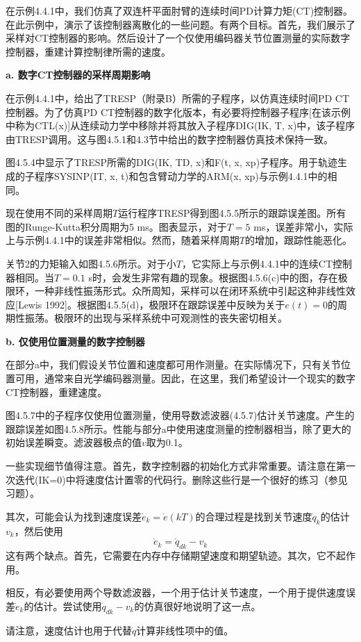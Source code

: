 \documentclass[UTF8]{ctexart}
\theoremstyle{definition}
\begin{document}
\begin{examplebox}[示例4.5-1：数字机器人计算力矩控制器的仿真]
在示例4.4.1中，我们仿真了双连杆平面肘臂的连续时间PD计算力矩(CT)控制器。在此示例中，演示了该控制器离散化的一些问题。有两个目标。首先，我们展示了采样对CT控制器的影响。然后设计了一个仅使用编码器关节位置测量的实际数字控制器，重建计算控制律所需的速度。

\textbf{a. 数字CT控制器的采样周期影响}

在示例4.4.1中，给出了TRESP（附录B）所需的子程序，以仿真连续时间PD CT控制器。为了仿真PD CT控制器的数字化版本，有必要将控制器子程序[在该示例中称为CTL(x)]从连续动力学中移除并将其放入子程序DIG(IK, T, x)中，该子程序由TRESP调用。这与图4.5.1和4.3节中给出的数字控制器仿真技术保持一致。

图4.5.4中显示了TRESP所需的DIG(IK, TD, x)和F(t, x, xp)子程序。用于轨迹生成的子程序SYSINP(IT, x, t)和包含臂动力学的ARM(x, xp)与示例4.4.1中的相同。

现在使用不同的采样周期$T$运行程序TRESP得到图4.5.5所示的跟踪误差图。所有图的Runge-Kutta积分周期为5 ms。图表显示，对于$T = 5$ ms，误差非常小，实际上与示例4.4.1中的误差非常相似。然而，随着采样周期$T$的增加，跟踪性能恶化。

关节2的力矩输入如图4.5.6所示。对于小$T$，它实际上与示例4.4.1中的连续CT控制器相同。当$T = 0.1$ s时，会发生非常有趣的现象。根据图4.5.6(c)中的图，存在极限环，一种非线性振荡形式。众所周知，采样可以在闭环系统中引起这种非线性效应[Lewis 1992]。根据图4.5.5(d)，极限环在跟踪误差中反映为关于$e(t) = 0$的周期性振荡。极限环的出现与采样系统中可观测性的丧失密切相关。

\textbf{b. 仅使用位置测量的数字控制器}

在部分a中，我们假设关节位置和速度都可用作测量。在实际情况下，只有关节位置可用，通常来自光学编码器测量。因此，在这里，我们希望设计一个现实的数字CT控制器，重建速度。

图4.5.7中的子程序仅使用位置测量，使用导数滤波器(4.5.7)估计关节速度。产生的跟踪误差如图4.5.8所示。性能与部分a中使用速度测量的控制器相当，除了更大的初始误差瞬变。滤波器极点的值$v$取为0.1。

一些实现细节值得注意。首先，数字控制器的初始化方式非常重要。请注意在第一次迭代(IK=0)中将速度估计置零的代码行。删除这些行是一个很好的练习（参见习题）。

其次，可能会认为找到速度误差$\dot{e}_k = \dot{e}(kT)$的合理过程是找到关节速度$\dot{q}_k$的估计$v_k$，然后使用
\begin{equation}
    \dot{e}_k = \dot{q}_{dk} - v_k
\end{equation}
这有两个缺点。首先，它需要在内存中存储期望速度和期望轨迹。其次，它不起作用。

相反，有必要使用两个导数滤波器，一个用于估计关节速度，一个用于提供速度误差$\dot{e}_k$的估计。尝试使用$\dot{q}_{dk} - v_k$的仿真很好地说明了这一点。

请注意，速度估计也用于代替$\dot{q}$计算非线性项中的值。
\end{examplebox}
\end{document}
